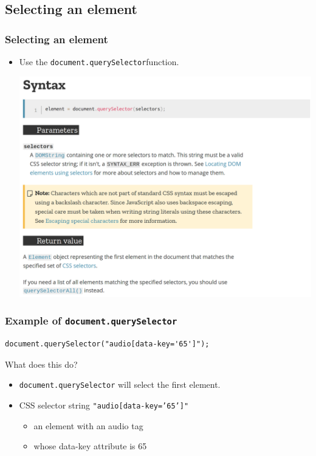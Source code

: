 \documentclass[handout,12pt]{beamer}
\begin{document}
\subsection{Selecting an element}
\begin{frame}
	\frametitle{Selecting an element}
	\begin{itemize}
		\item Use the \texttt{document.querySelector}\footnotemark function.
		\begin{center}
\includegraphics[width=0.7\linewidth]{querySelector-MDN}
\end{center}
	\end{itemize}
\end{frame}

\begin{frame}[fragile]
	\frametitle{Example of \texttt{document.querySelector}}
		\begin{verbatim}
document.querySelector("audio[data-key='65']");
		\end{verbatim}
What does this do?		
	\begin{itemize}
		\item \texttt{document.querySelector} will select the first element.
		\item CSS selector string \texttt{"audio[data-key='65']"}
		\begin{itemize}
			\item an element with an audio tag
			\item whose data-key attribute is 65
		\end{itemize} 
	\end{itemize}
\end{frame}
\end{document}
